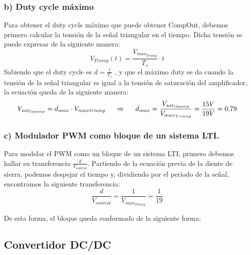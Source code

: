 \documentclass[e4_tp2_main.tex]{subfiles}
\begin{document}
\subsubsection*{b) Duty cycle m\'aximo}
Para obtener el duty cycle máximo que puede obtener CompOut, debemos primero calcular la tensión de la señal triangular en el tiempo. Dicha tensión se puede expresar de la siguiente manera:
\begin{equation}
V_{Triang}(t)= \frac{V_{max_{Triang}}}{T_s} \cdot t
\end{equation} 
Sabiendo que el duty cycle es $ d=\frac{t}{T_s}$  , y que el máximo duty se da cuando la tensión de la señal triangular es igual a la tensión de saturación del amplificador, la ecuación queda de la siguiente manera:
\begin{equation}
V_{sat_{Opamp}}= d_{max} \cdot V_{maxtriang} \hspace{0.5cm} \Rightarrow  \hspace{0.5cm} d_{max}= \frac{V_{sat_{Opamp}}}{V_{max_{Triang}}}=\frac{15 V}{19V}=0.79
\end{equation}
\subsubsection*{c) Modulador PWM como bloque de un sistema LTI.}
Para modelar el PWM como un bloque de un sistema LTI, primero debemos hallar su transferencia $\frac{d}{V_{control}}$. Partiendo de la ecuación previa de la diente de sierra, podemos despejar el tiempo y, dividiendo por el período de la señal, encontramos la siguiente transferencia:
\begin{equation}
\frac{d}{V_{control}}=\frac{1}{V_{max_{Triang}}}=\frac{1}{19}
\end{equation} 

De esta forma, el bloque queda conformado de la siguiente forma:

\begin{center}
\end{center}



\subsection{Convertidor DC/DC}
\end{document}
